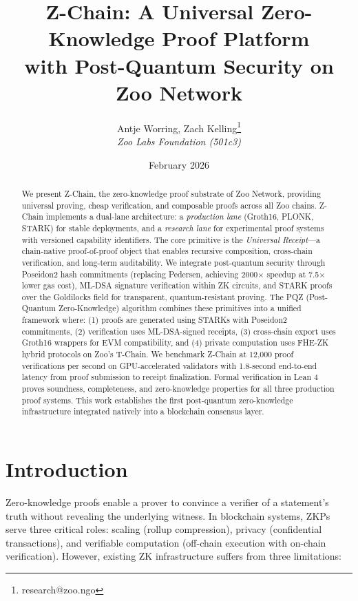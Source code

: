 \documentclass[11pt,a4paper]{article}
\title{\textbf{Z-Chain: A Universal Zero-Knowledge Proof Platform\\with Post-Quantum Security on Zoo Network}}
\author{
Antje Worring, Zach Kelling\thanks{research@zoo.ngo}\\
\textit{Zoo Labs Foundation (501c3)}
}
\date{February 2026}
\begin{document}
\zoocoverpage
\maketitle

\begin{abstract}
We present Z-Chain, the zero-knowledge proof substrate of Zoo Network, providing universal proving, cheap verification, and composable proofs across all Zoo chains. Z-Chain implements a dual-lane architecture: a \emph{production lane} (Groth16, PLONK, STARK) for stable deployments, and a \emph{research lane} for experimental proof systems with versioned capability identifiers. The core primitive is the \emph{Universal Receipt}---a chain-native proof-of-proof object that enables recursive composition, cross-chain verification, and long-term auditability. We integrate post-quantum security through Poseidon2 hash commitments (replacing Pedersen, achieving 2000$\times$ speedup at 7.5$\times$ lower gas cost), ML-DSA signature verification within ZK circuits, and STARK proofs over the Goldilocks field for transparent, quantum-resistant proving. The PQZ (Post-Quantum Zero-Knowledge) algorithm combines these primitives into a unified framework where: (1) proofs are generated using STARKs with Poseidon2 commitments, (2) verification uses ML-DSA-signed receipts, (3) cross-chain export uses Groth16 wrappers for EVM compatibility, and (4) private computation uses FHE-ZK hybrid protocols on Zoo's T-Chain. We benchmark Z-Chain at 12,000 proof verifications per second on GPU-accelerated validators with 1.8-second end-to-end latency from proof submission to receipt finalization. Formal verification in Lean 4 proves soundness, completeness, and zero-knowledge properties for all three production proof systems. This work establishes the first post-quantum zero-knowledge infrastructure integrated natively into a blockchain consensus layer.
\end{abstract}

\section{Introduction}

Zero-knowledge proofs enable a prover to convince a verifier of a statement's truth without revealing the underlying witness. In blockchain systems, ZKPs serve three critical roles: scaling (rollup compression), privacy (confidential transactions), and verifiable computation (off-chain execution with on-chain verification). However, existing ZK infrastructure suffers from three limitations:
\end{document}
